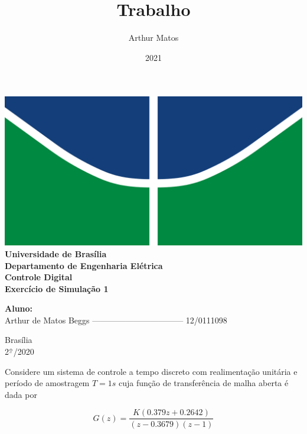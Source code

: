 \documentclass{article}
\title{Trabalho}
\author{Arthur Matos}
\date{2021}
\newcommand{\ubar}[1]{\underaccent{\bar}{#1}}
\begin{document}
\begin{titlepage}
    \begin{center}
        \centering
        \includegraphics[width=.7\linewidth]{images/logo_unb.png}\\[0.5cm]
        {\large \textbf{Universidade de Brasília}}\\[0.2cm]
        {\large \textbf{Departamento de Engenharia Elétrica}}\\[0.2cm]
        {\large \textbf{Controle Digital}}\\[4.8cm]
        {\bf \huge {Exercício de Simulação 1}}\\[0.2cm]
        {\bf \large {}}
    \end{center}

    \vspace{5cm}
    \hspace{2cm} {\noindent \bf \large {Aluno:}}\\
    \vspace{0.8cm}
    \hspace{2.35cm} {\large Arthur de Matos Beggs --------------------------------- 12/0111098}\\[1cm]

    \begin{center}
        {\large Brasília}\\
        {\large 2$^{\ubar{\circ}}$/2020}
    \end{center}

\end{titlepage}
\clearpage
\setcounter{page}{2}
\clearpage



{\Large \bf {
    Considere um sistema de controle a tempo discreto com realimentação
    unitária e período de amostragem $ T = 1s $ cuja função de transferência de
    malha aberta é dada por

    \[ G(z) = \frac{K(0.379z + 0.2642)}{(z-0.3679)(z-1)} \]
}}
\end{document}

